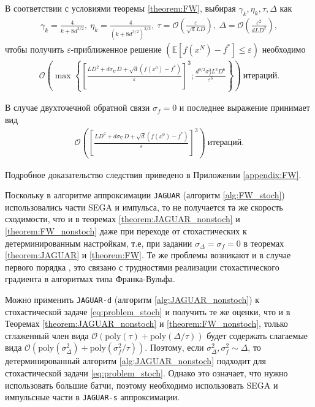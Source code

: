     \begin{corollary} \label{cor:FW}
        В соответствии с условиями теоремы \ref{theorem:FW}, выбирая $\gamma_k, \eta_k, \tau, \Delta$ как
        \begin{align*}
            \gamma_k = \frac{4}{k + 8d^{3/2}},\ \eta_k = \frac{4}{(k + 8d^{3/2})^{2/3}},\ \tau = \mathcal{O} \left(\frac{\varepsilon}{\sqrt{d} L D} \right),\ \Delta = \mathcal{O} \left( \frac{\varepsilon^2}{d L D^2}\right),
        \end{align*}
        чтобы получить $\varepsilon$-приближенное решение $(\mathbb{E} \left[ f(x^N) - f^* \right] \leq \varepsilon)$ необходимо
        \begin{align*}
            \mathcal{O} \left( \max \left\{ \left[ \frac{L D^2 + d \sigma_\nabla D + \sqrt{d} (f(x^0) - f^*)}{\varepsilon} \right]^3; \frac{d^{9 / 2} \sigma_f^3 L^3 D^6}{\varepsilon^6} \right\} \right)\ \text{итераций}.
            \end{align*}

        \noindent В случае двухточечной обратной связи $\sigma_f = 0$ и последнее выражение принимает вид
        \begin{align*}
            \mathcal{O} \left( \left[ \frac{L D^2 + d \sigma_\nabla D + \sqrt{d} (f(x^0) - f^*)}{\varepsilon} \right]^3 \right)\ \text{итераций}.
        \end{align*}

        \noindent Подробное доказательство следствия приведено в Приложении \ref{appendix:FW}.
            
    \end{corollary}

    Поскольку в алгоритме аппроксимации \texttt{JAGUAR} (алгоритм \ref{alg:FW_stoch}) использовались части SEGA и импульса, то не получается та же скорость сходимости, что и в теоремах \ref{theorem:JAGUAR_nonstoch} и \ref{theorem:FW_nonstoch} даже при переходе от стохастических к детерминированным настройкам, т.е, при задании $\sigma_\Delta = \sigma_f = 0$ в теоремах \ref{theorem:JAGUAR} и \ref{theorem:FW}. Те же проблемы возникают и в случае первого порядка \cite{mokhtari2020stochastic, zhang2020one}, это связано с трудностями реализации стохастического градиента в алгоритмах типа Франка-Вульфа. 

    Можно применить \texttt{JAGUAR-d} (алгоритм \ref{alg:JAGUAR_nonstoch}) к стохастической задаче \eqref{eq:problem_stoch} и получить те же оценки, что и в Теоремах \ref{theorem:JAGUAR_nonstoch} и \ref{theorem:FW_nonstoch}, только сглаженный член вида $\mathcal{O} \left( \text{poly} (\tau) + \text{poly} (\Delta / \tau) \right)$ будет содержать слагаемые вида $\mathcal{O} \left( \text{poly}(\sigma_\Delta^2) + \text{poly} (\sigma_f^2 / \tau) \right)$. Поэтому, если $\sigma_\Delta^2, \sigma_f^2 \sim \Delta$, то детерминированный алгоритм \ref{alg:JAGUAR_nonstoch} подходит для стохастической задачи \eqref{eq:problem_stoch}. Однако это означает, что нужно использовать большие батчи, поэтому необходимо использовать SEGA и импульсные части в \texttt{JAGUAR-s} аппроксимации.
